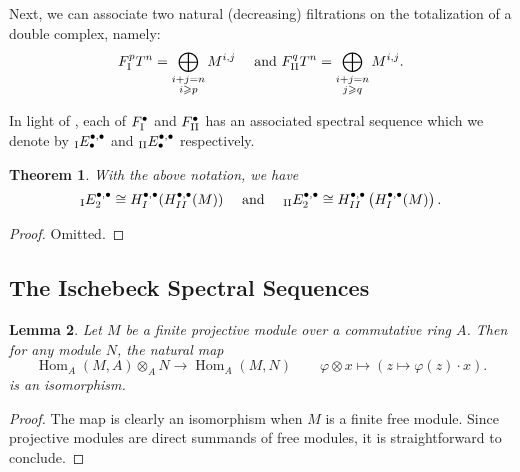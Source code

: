 \documentclass[11pt]{article}
\theoremstyle{thmstyle}
\newtheorem{theorem}{Theorem}
\newtheorem{lemma}[theorem]{Lemma}
\theoremstyle{defstyle}
\newcommand{\Hom}{\operatorname{Hom}}
\renewcommand{\ge}{\geqslant}
\begin{document}
Next, we can associate two natural (decreasing) filtrations on the totalization of a double complex, namely: 
\begin{equation*}
    F^p_{\rm I} T^n = \bigoplus_{\substack{i + j = n\\i\ge p}} M^{i, j}\quad\text{ and } F^q_{\rm II} T^n = \bigoplus_{\substack{i + j = n\\ j\ge q}} M^{i, j}.
\end{equation*}

In light of , each of $F^\bullet_{\rm I}$ and $F^{\bullet}_{\rm II}$ has an associated spectral sequence which we denote by $_{\rm I} E^{\bullet,\bullet}_{\bullet}$ and $_{\rm II} E^{\bullet,\bullet}_{\bullet}$ respectively.

\begin{theorem}
    With the above notation, we have 
    \begin{equation*}
        {}_{\rm I}E^{\bullet, \bullet}_2 \cong H^{\bullet,\bullet}_I(H^{\bullet,\bullet}_{II}(M))\quad\text{ and }\quad {}_{\rm II} E^{\bullet, \bullet}_2\cong H^{\bullet,\bullet}_{II}\left(H^{\bullet, \bullet}_{I}(M)\right).
    \end{equation*}
\end{theorem}
\begin{proof}
    Omitted.
\end{proof}

\subsection*{The Ischebeck Spectral Sequences}

\begin{lemma}
    Let $M$ be a finite projective module over a commutative ring $A$. Then for any module $N$, the natural map 
    \begin{equation*}
        \Hom_A(M, A)\otimes_A N\to\Hom_A(M, N)\qquad \varphi\otimes x\longmapsto \left(z\mapsto\varphi(z)\cdot x\right).
    \end{equation*}
    is an isomorphism.
\end{lemma}
\begin{proof}
    The map is clearly an isomorphism when $M$ is a finite free module. Since projective modules are direct summands of free modules, it is straightforward to conclude.
\end{proof}
\end{document}
